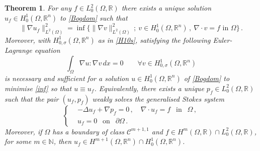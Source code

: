 \documentclass[11pt]{article}
\newtheorem{theorem}{Theorem}[section]
\theoremstyle{plain}
\theoremstyle{definition}
\numberwithin{equation}{section}
\newcommand{\R}{\mathbb{R}}
\begin{document}
\begin{theorem}\label{minBog}
For any $f\in L^2_0(\Omega,\R)$ there exists a unique solution
$u_f\in H^1_0(\Omega,\R^n)$ to \eqref{Bogdom} such that
\begin{equation}\label{inf}
\|\nabla u_f\|_{L^2(\Omega)}^2=\inf\Big\{\|\nabla v\|_{L^2(\Omega)}^2\, ;\ v\in H^1_0(\Omega,\R^n)\, ,\ \nabla\cdot v=f\text{ in }\Omega\Big\}\, .
\end{equation}
Moreover, with $H^1_{0,\sigma}(\Omega,\R^n)$ as in \eqref{H10s}, satisfying the following Euler-Lagrange equation
\begin{equation}\label{ELeq}
\int_\Omega \nabla u : \nabla v\, dx=0\qquad\forall v\in H^1_{0,\sigma}(\Omega,\R^n)
\end{equation}
is necessary and sufficient for a solution $u\in H^1_0(\Omega,\R^n)$ of \eqref{Bogdom} to minimise \eqref{inf} so that $u\equiv u_f$. Equivalently,
there exists a unique $p_{f} \in L^2_0(\Omega,\R)$ such that the pair $(u_{f},p_{f})$ weakly solves the generalised Stokes system
\begin{equation} \label{gstokes}
\left\{
\begin{aligned}
	& - \Delta u_{f} + \nabla p_{f} = 0 \, , \quad \nabla \cdot u_{f} = f \ \ \mbox{ in } \ \ \Omega \, , \\[5pt]
	& u_{f}=0 \ \ \mbox{ on } \ \ \partial \Omega  \, .
\end{aligned}
\right.
\end{equation}
Moreover, if $\Omega$ has a boundary of class $\mathcal{C}^{m+1,1}$ and $f\in H^{m}(\Omega, \mathbb{R}) \cap L^2_0(\Omega, \mathbb{R})$, for some $m \in \mathbb{N}$, then $u_f\in H^{m+1}(\Omega, \mathbb{R}^{n}) \cap H^1_0(\Omega, \mathbb{R}^{n})$.
\end{theorem}
\noindent
\end{document}
